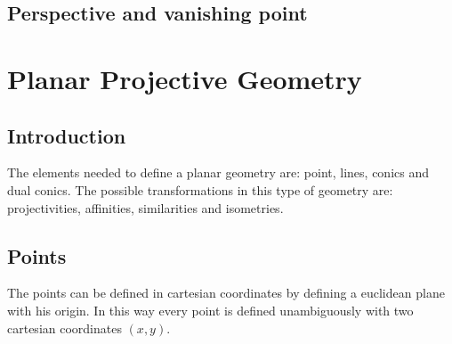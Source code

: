 \documentclass[12pt, a4paper]{report}
\newtheorem[style=M,bodystyle=\normalfont]{theorem}{Theorem}
\newtheorem[style=M,bodystyle=\normalfont]{corollary}{Corollary}
\newtheorem[style=M,bodystyle=\normalfont]{lemma}{Lemma}
\newtheorem[style=M,bodystyle=\normalfont]{definition}{Definition}
\begin{document}
    \section{Perspective and vanishing point}

\newpage

\chapter{Planar Projective Geometry}
    \section{Introduction}
    The elements needed to define a planar geometry are: point, lines, conics and dual conics. The possible transformations in this type of geometry are: projectivities, 
    affinities, similarities and isometries. 

    \section{Points}
    The points can be defined in cartesian coordinates by defining a euclidean plane with his origin. In this way every point is defined unambiguously with two cartesian 
    coordinates $(x,y)$. 
\end{document}
